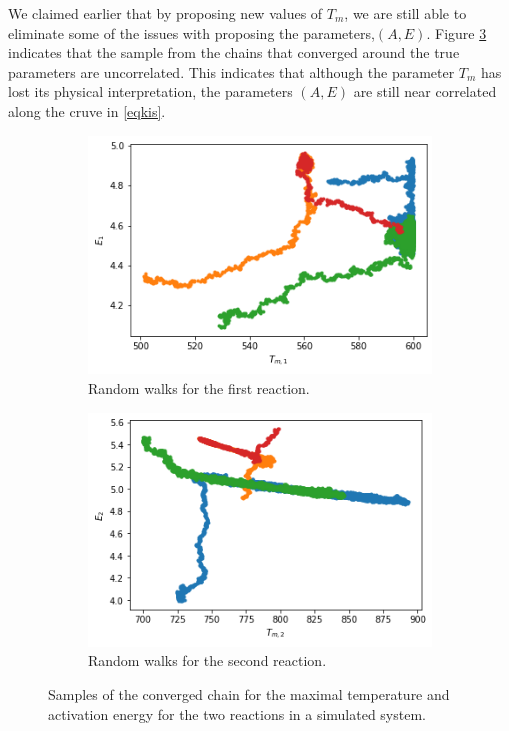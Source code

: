 We claimed earlier that by proposing new values of $T_m$, we are still able to eliminate some of the issues with proposing the parameters,$(A,E)$. Figure \ref{fig:modal_sample} indicates that the sample from the chains that converged around the true parameters are uncorrelated. This indicates that although the parameter $T_m$ has lost its physical interpretation, the parameters $(A,E)$ are still near correlated along the cruve in \ref{eqkis}.\\

\begin{figure}[h!]
\centering
\begin{subfigure}{.5\textwidth}
  \centering
  \includegraphics[width=\linewidth]{figures/bayesian/2_reactions/E1vsTm1.png}
  \caption{Random walks for the first reaction.}
  \label{fig:subwalk1}
\end{subfigure}%
\begin{subfigure}{.5\textwidth}
  \centering
  \includegraphics[width=\linewidth]{figures/bayesian/2_reactions/E2vsTm2.png}
  \caption{Random walks for the second reaction.}
  \label{fig:subwalk2}
\end{subfigure}%
\caption{Samples of the converged chain for the maximal temperature and activation energy for the two reactions in a simulated system.}
\label{fig:modal_sample}
\end{figure}


